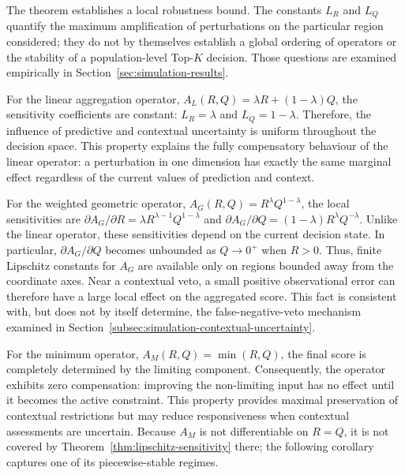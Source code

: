 \documentclass[mathematics,article,submit,moreauthors]{Definitions/mdpi}
\begin{document}
{\color{blue}The theorem establishes a local robustness bound. The
constants $L_R$ and $L_Q$ quantify the maximum amplification of
perturbations on the particular region considered; they do not by
themselves establish a global ordering of operators or the stability of a
population-level Top-$K$ decision. Those questions are examined
empirically in Section~\ref{sec:simulation-results}.}

For the linear aggregation operator,
$A_L(R,Q)=\lambda R+(1-\lambda)Q$,
the sensitivity coefficients are constant:
$L_R=\lambda$ and $L_Q=1-\lambda$.
Therefore, the influence of predictive and contextual uncertainty is
uniform throughout the decision space. This property explains the fully
compensatory behaviour of the linear operator: a perturbation in one
dimension has exactly the same marginal effect regardless of the
current values of prediction and context.

For the weighted geometric operator,
$A_G(R,Q)=R^\lambda Q^{1-\lambda}$,
the local sensitivities are
$\partial A_G/\partial R=\lambda R^{\lambda-1}Q^{1-\lambda}$
and
$\partial A_G/\partial Q=(1-\lambda)R^\lambda Q^{-\lambda}$.
{\color{blue}Unlike the linear operator, these sensitivities depend on the
current decision state. In particular, $\partial A_G/\partial Q$ becomes
unbounded as $Q\to0^+$ when $R>0$. Thus, finite Lipschitz constants for
$A_G$ are available only on regions bounded away from the coordinate axes.
Near a contextual veto, a small positive observational error can therefore
have a large local effect on the aggregated score. This fact is consistent
with, but does not by itself determine, the false-negative-veto mechanism
examined in Section~\ref{subsec:simulation-contextual-uncertainty}.}

For the minimum operator,
{\color{teal}$A_M(R,Q)=\min(R,Q)$,}
the final score is completely determined by the limiting component.
Consequently, the operator exhibits zero compensation: improving the
non-limiting input has no effect until it becomes the active constraint.
This property provides maximal preservation of contextual restrictions
but may reduce responsiveness when contextual assessments are uncertain.
{\color{blue}Because $A_M$ is not differentiable on $R=Q$, it is not covered
by Theorem~\ref{thm:lipschitz-sensitivity} there; the following corollary
captures one of its piecewise-stable regimes.}
\end{document}
